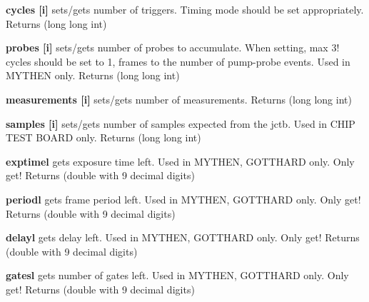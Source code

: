 \begin{DoxyItemize}
\item {\bfseries cycles \mbox{[}i\mbox{]}} sets/gets number of triggers. Timing mode should be set appropriately. {\ttfamily Returns} {\ttfamily }(long long int)
\end{DoxyItemize}


\begin{DoxyItemize}
\item {\bfseries probes \mbox{[}i\mbox{]}} sets/gets number of probes to accumulate. When setting, max 3! cycles should be set to 1, frames to the number of pump-\/probe events. Used in MYTHEN only. {\ttfamily Returns} {\ttfamily }(long long int)
\end{DoxyItemize}


\begin{DoxyItemize}
\item {\bfseries measurements \mbox{[}i\mbox{]}} sets/gets number of measurements. {\ttfamily Returns} {\ttfamily }(long long int)
\end{DoxyItemize}


\begin{DoxyItemize}
\item {\bfseries samples \mbox{[}i\mbox{]}} sets/gets number of samples expected from the jctb. Used in CHIP TEST BOARD only. {\ttfamily Returns} {\ttfamily }(long long int)
\end{DoxyItemize}


\begin{DoxyItemize}
\item {\bfseries exptimel} gets exposure time left. Used in MYTHEN, GOTTHARD only. Only get! {\ttfamily Returns} {\ttfamily }(double with 9 decimal digits)
\end{DoxyItemize}


\begin{DoxyItemize}
\item {\bfseries periodl} gets frame period left. Used in MYTHEN, GOTTHARD only. Only get! {\ttfamily Returns} {\ttfamily }(double with 9 decimal digits)
\end{DoxyItemize}


\begin{DoxyItemize}
\item {\bfseries delayl} gets delay left. Used in MYTHEN, GOTTHARD only. Only get! {\ttfamily Returns} {\ttfamily }(double with 9 decimal digits)
\end{DoxyItemize}


\begin{DoxyItemize}
\item {\bfseries gatesl} gets number of gates left. Used in MYTHEN, GOTTHARD only. Only get! {\ttfamily Returns} {\ttfamily }(double with 9 decimal digits)
\end{DoxyItemize}


